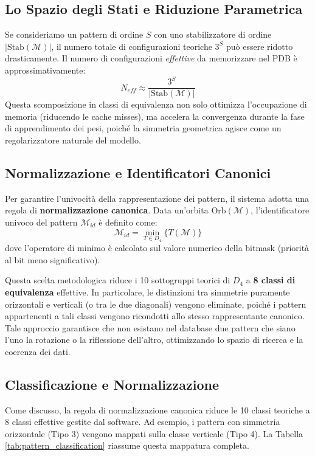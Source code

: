 \subsection{Lo Spazio degli Stati e Riduzione Parametrica}
Se consideriamo un pattern di ordine $S$ con uno stabilizzatore di ordine $|\text{Stab}(\mathcal{M})|$, il numero totale di configurazioni teoriche $3^S$ può essere ridotto drasticamente. Il numero di configurazioni \textit{effettive} da memorizzare nel PDB è approssimativamente:
\begin{equation}
    N_{eff} \approx \frac{3^S}{|\text{Stab}(\mathcal{M})|}
\end{equation}
Questa scomposizione in classi di equivalenza non solo ottimizza l'occupazione di memoria (riducendo le cache misses), ma accelera la convergenza durante la fase di apprendimento dei pesi, poiché la simmetria geometrica agisce come un regolarizzatore naturale del modello.

\subsection{Normalizzazione e Identificatori Canonici}
Per garantire l'univocità della rappresentazione dei pattern, il sistema adotta una regola di \textbf{normalizzazione canonica}. Data un'orbita $\text{Orb}(\mathcal{M})$, l'identificatore univoco del pattern $\mathcal{M}_{id}$ è definito come:
\begin{equation}
    \mathcal{M}_{id} = \min_{T \in D_4} \{ T(\mathcal{M}) \}
\end{equation}
dove l'operatore di minimo è calcolato sul valore numerico della bitmask (priorità al bit meno significativo).

Questa scelta metodologica riduce i 10 sottogruppi teorici di $D_4$ a \textbf{8 classi di equivalenza} effettive. In particolare, le distinzioni tra simmetrie puramente orizzontali e verticali (o tra le due diagonali) vengono eliminate, poiché i pattern appartenenti a tali classi vengono ricondotti allo stesso rappresentante canonico. Tale approccio garantisce che non esistano nel database due pattern che siano l'uno la rotazione o la riflessione dell'altro, ottimizzando lo spazio di ricerca e la coerenza dei dati.

\subsection{Classificazione e Normalizzazione}

Come discusso, la regola di normalizzazione canonica riduce le 10 classi teoriche a 8 classi effettive gestite dal software. Ad esempio, i pattern con simmetria orizzontale (Tipo 3) vengono mappati sulla classe verticale (Tipo 4). La Tabella \ref{tab:pattern_classification} riassume questa mappatura completa.

